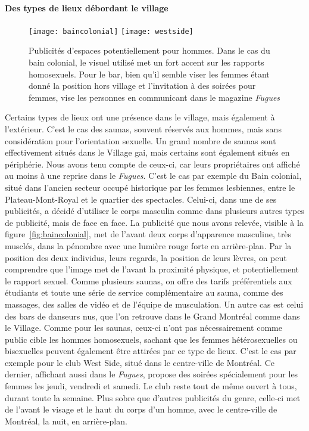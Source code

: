 \paragraph{Des types de lieux débordant le village}
\begin{figure}[ht]
  \centering
  {\texttt{[image: baincolonial]}}
  {\texttt{[image: westside]}}
  \caption[Publicités d'espaces hors village]{Publicités d'espaces potentiellement pour hommes. Dans le cas du bain colonial, le visuel utilisé met un fort accent sur les rapports homosexuels. Pour le bar, bien qu'il semble viser les femmes étant donné la position hors village et l'invitation à des soirées pour femmes, vise les personnes \lgbt{} en communicant dans le magazine \emph{Fugues}}\label{figs:horsvillage}
\end{figure}
Certains types de lieux ont une présence dans le village, mais également à l'extérieur.
C'est le cas des saunas, souvent réservés aux hommes, mais sans considération pour l'orientation sexuelle.
Un grand nombre de saunas sont effectivement situés dans le Village gai, mais certains sont également situés en périphérie.
Nous avons tenu compte de ceux-ci, car leurs propriétaires ont affiché au moins à une reprise dans le \emph{Fugues}.
C'est le cas par exemple du Bain colonial, situé dans l'ancien secteur occupé historique par les femmes lesbiennes, entre le Plateau-Mont-Royal et le quartier des spectacles.
Celui-ci, dans une de ses publicités, a décidé d'utiliser le corps masculin comme dans plusieurs autres types de publicité, mais de face en face.
La publicité que nous avons relevée, visible à la figure~\ref{fig:baincolonial}, met de l'avant deux corps d'apparence masculine, très musclés, dans la pénombre avec une lumière rouge forte en arrière-plan.
Par la position des deux individus, leurs regards, la position de leurs lèvres, on peut comprendre que l'image met de l'avant la proximité physique, et potentiellement le rapport sexuel.
Comme plusieurs saunas, on offre des tarifs préférentiels aux étudiants et toute une série de service complémentaire au sauna, comme des massages, des salles de vidéo et de l'équipe de musculation.
Un autre cas est celui des bars de danseurs nus, que l'on retrouve dans le Grand Montréal comme dans le Village.
Comme pour les saunas, ceux-ci n'ont pas nécessairement comme public cible les hommes homosexuels, sachant que les femmes hétérosexuelles ou bisexuelles peuvent également être attirées par ce type de lieux.
C'est le cas par exemple pour le club West Side, situé dans le centre-ville de Montréal.
Ce dernier, affichant aussi dans le \emph{Fugues}, propose des soirées spécialement pour les femmes les jeudi, vendredi et samedi.
Le club reste tout de même ouvert à tous, durant toute la semaine.
Plus sobre que d'autres publicités du genre, celle-ci met de l'avant le visage et le haut du corps d'un homme, avec le centre-ville de Montréal, la nuit, en arrière-plan.

